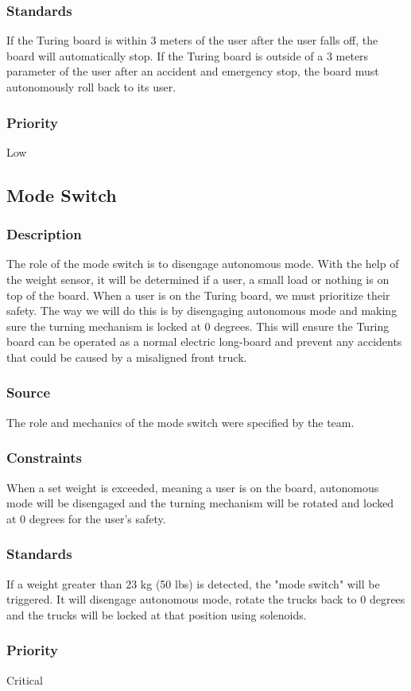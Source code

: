 \subsubsection{Standards}
If the Turing board is within 3 meters of the user after the user falls off, the board will automatically stop.\hfill \break
If the Turing board is outside of a 3 meters parameter of the user after an accident and emergency stop, the board must autonomously roll back to its user. 
\subsubsection{Priority}
Low

\subsection{Mode Switch}
\subsubsection{Description}
The role of the mode switch is to disengage autonomous mode. With the help of the weight sensor, it will be determined if a user, a small load or nothing is on top of the board. When a user is on the Turing board, we must prioritize their safety. The way we will do this is by disengaging autonomous mode and making sure the turning mechanism is locked at 0 degrees. This will ensure the Turing board can be operated as a normal electric long-board and prevent any accidents that could be caused by a misaligned front truck. 
\subsubsection{Source}
The role and mechanics of the mode switch were specified by the team.
\subsubsection{Constraints}
When a set weight is exceeded, meaning a user is on the board, autonomous mode will be disengaged and the turning mechanism will be rotated and locked at 0 degrees for the user's safety.
\subsubsection{Standards}
If a weight greater than 23 kg (50 lbs) is detected, the "mode switch" will be triggered. It will disengage autonomous mode, rotate the trucks back to 0 degrees and the trucks will be locked at that position using solenoids.
\subsubsection{Priority}
Critical